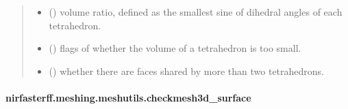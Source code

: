 \documentclass[letterpaper,10pt,english]{sphinxmanual}
\begin{document}
\begin{fulllineitems}
\begin{quote}
\begin{description}
\begin{itemize}
\item {} 
\sphinxAtStartPar
{} () \textendash{} volume ratio, defined as the smallest sine of dihedral angles of each tetrahedron.

\item {} 
\sphinxAtStartPar
{} () \textendash{} flags of whether the volume of a tetrahedron is too small.

\item {} 
\sphinxAtStartPar
{} () \textendash{} whether there are faces shared by more than two tetrahedrons.

\end{itemize}


\end{description}\end{quote}

\end{fulllineitems}


\sphinxstepscope


\paragraph{nirfasterff.meshing.meshutils.checkmesh3d\_surface}
\label{\detokenize{_autosummary/nirfasterff.meshing.meshutils.checkmesh3d_surface:nirfasterff-meshing-meshutils-checkmesh3d-surface}}\label{\detokenize{_autosummary/nirfasterff.meshing.meshutils.checkmesh3d_surface::doc}}
\end{document}
